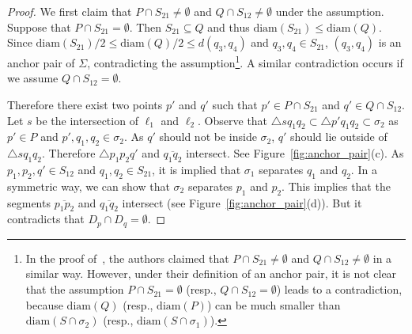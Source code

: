\documentclass[10pt,a4paper]{article}
\theoremstyle{star}
\theoremstyle{claimstar}
\newcommand{\diam}{\ensuremath{\mathrm{diam}}}
\begin{document}
\begin{proof}

    We first claim that $P \cap S_{21} \neq \emptyset$ and $Q \cap S_{12} \neq \emptyset$ under the assumption.
    Suppose that $P \cap S_{21} = \emptyset$. Then $S_{21} \subseteq Q$ and thus $\diam(S_{21}) \le \diam(Q)$.  
    Since $\diam(S_{21})/2 \le \diam(Q)/2 \le d(q_3, q_4)$ and $q_3, q_4 \in S_{21}$, $(q_3, q_4)$ is an anchor pair of $\Sigma$, contradicting the assumption\footnote{
    In the proof of~\cite{agarwalTwo}, the authors claimed that  $P \cap S_{21} \neq \emptyset$ and $Q \cap S_{12} \neq \emptyset$ in a similar way. 
    However, under their definition of an anchor pair, it is not clear that the assumption $P \cap S_{21} = \emptyset$ (resp., $Q \cap S_{12} = \emptyset$) leads to a contradiction,
    because $\diam(Q)$ (resp., $\diam(P)$) can be much smaller than $\diam(S \cap \sigma_2)$ (resp., $\diam(S \cap \sigma_1)$).}.
    A similar contradiction occurs if we assume $Q \cap S_{12} = \emptyset$.

    Therefore there exist two points $p'$ and $q'$ such that $p' \in P \cap S_{21}$ and $q' \in Q \cap S_{12}$.
    Let $s$ be the intersection of $\ell_1$ and $\ell_2$. 
    Observe that $\triangle sq_1 q_2 \subset \triangle p'q_1 q_2 \subset \sigma_2$ as $p' \in P$ and $p', q_1, q_2 \in \sigma_2$. 
    As $q'$ should not be inside $\sigma_2$, $q'$ should lie outside of $\triangle s q_1 q_2$. 
    Therefore $\triangle p_1 p_2 q'$ and $\overline{q_1 q_2}$ intersect. See Figure~\ref{fig:anchor_pair}(c).
    As $p_1, p_2, q' \in S_{12}$ and $q_1, q_2 \in S_{21}$, it is implied that  $\sigma_1$ separates $q_1$ and $q_2$.
    In a symmetric way, we can show that $\sigma_2$ separates $p_1$ and $p_2$. 
    This implies that the segments $\overline{p_1 p_2}$ and $\overline{q_1 q_2}$ intersect (see Figure~\ref{fig:anchor_pair}(d)). But it contradicts that $D_p \cap D_q = \emptyset$. 
\end{proof}
\end{document}
